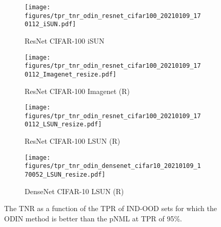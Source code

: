 \documentclass{article}
\begin{document}
\begin{figure}[tb]
\centering
\begin{subfigure}[t]{0.49\linewidth}
    \texttt{[image: figures/tpr\_tnr\_odin\_resnet\_cifar100\_20210109\_170112\_iSUN.pdf]}
    \caption{ResNet CIFAR-100 iSUN  \label{fig:tpr_tnr_odin_resnet_cifar100_iSUN}}
\end{subfigure}
\begin{subfigure}[t]{0.49\linewidth}
    \texttt{[image: figures/tpr\_tnr\_odin\_resnet\_cifar100\_20210109\_170112\_Imagenet\_resize.pdf]}
    \caption{ResNet CIFAR-100 Imagenet (R) \label{fig:tpr_tnr_odin_resnet_cifar100_imagenet_resize}}
\end{subfigure}
\begin{subfigure}[t]{0.49\linewidth}
    \texttt{[image: figures/tpr\_tnr\_odin\_resnet\_cifar100\_20210109\_170112\_LSUN\_resize.pdf]}
    \caption{ResNet CIFAR-100 LSUN (R)  \label{fig:tpr_tnr_odin_resnet_cifar100_LSUN_resize}}
\end{subfigure}
\begin{subfigure}[t]{0.49\linewidth}
    \texttt{[image: figures/tpr\_tnr\_odin\_densenet\_cifar10\_20210109\_170052\_LSUN\_resize.pdf]}
    \caption{DenseNet CIFAR-10 LSUN (R) \label{fig:tpr_tnr_odin_densenet_cifar10_LSUN_resize}}
\end{subfigure}
\caption{The TNR as a function of the TPR of IND-OOD sets for which the ODIN method is better than the pNML at TPR of 95\%.}
\label{fig:tpr_vs_tnr}
\end{figure} 
\end{document}

